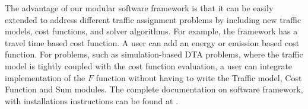 The advantage of our modular software framework is that it can be easily extended to address different traffic assignment problems by including new traffic models, cost functions, and solver algorithms. For example, the framework has a travel time based cost function. A user can add an energy or emission based cost function. For problems, such as simulation-based DTA problems, where the traffic model is tightly coupled with the cost function evaluation, a user can integrate implementation of the $F$ function without having to write the Traffic model, Cost Function and Sum modules. The complete documentation on software framework, with installations instructions can be found at \cite{ta_solver}.